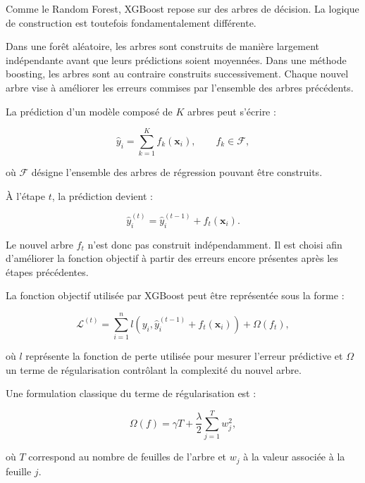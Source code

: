 Comme le Random Forest, XGBoost repose sur des arbres de décision. La logique de construction est toutefois fondamentalement différente.

Dans une forêt aléatoire, les arbres sont construits de manière largement indépendante avant que leurs prédictions soient moyennées. Dans une méthode boosting, les arbres sont au contraire construits successivement. Chaque nouvel arbre vise à améliorer les erreurs commises par l'ensemble des arbres précédents.

La prédiction d'un modèle composé de $K$ arbres peut s'écrire :

\begin{equation}
    \widehat{y}_i
    =
    \sum_{k=1}^{K}
    f_k(\mathbf{x}_i),
    \qquad
    f_k \in \mathcal{F},
    \label{eq:xgb_sum}
\end{equation}

où $\mathcal{F}$ désigne l'ensemble des arbres de régression pouvant être construits.

À l'étape $t$, la prédiction devient :

\begin{equation}
    \widehat{y}_i^{(t)}
    =
    \widehat{y}_i^{(t-1)}
    +
    f_t(\mathbf{x}_i).
\end{equation}

Le nouvel arbre $f_t$ n'est donc pas construit indépendamment. Il est choisi afin d'améliorer la fonction objectif à partir des erreurs encore présentes après les étapes précédentes.

La fonction objectif utilisée par XGBoost peut être représentée sous la forme :

\begin{equation}
    \mathcal{L}^{(t)}
    =
    \sum_{i=1}^{n}
    l
    \left(
    y_i,
    \widehat{y}_i^{(t-1)}
    +
    f_t(\mathbf{x}_i)
    \right)
    +
    \Omega(f_t),
    \label{eq:xgb_obj}
\end{equation}

où $l$ représente la fonction de perte utilisée pour mesurer l'erreur prédictive et $\Omega$ un terme de régularisation contrôlant la complexité du nouvel arbre.

Une formulation classique du terme de régularisation est :

\begin{equation}
    \Omega(f)
    =
    \gamma T
    +
    \frac{\lambda}{2}
    \sum_{j=1}^{T} w_j^2,
\end{equation}

où $T$ correspond au nombre de feuilles de l'arbre et $w_j$ à la valeur associée à la feuille $j$.

